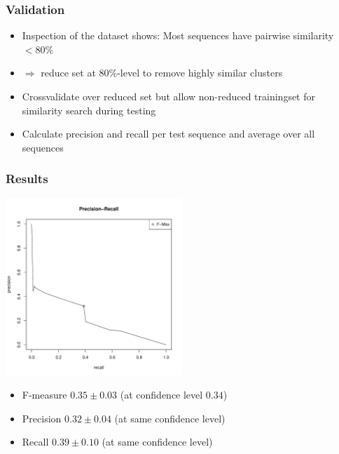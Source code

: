 \documentclass{beamer}
\begin{document}
\begin{frame}
	\frametitle{Validation}
	
	\begin{itemize}
		\item Inspection of the dataset shows: Most sequences have pairwise similarity $< 80\%$
		\item[] $\Rightarrow$ reduce set at $80\%$-level to remove highly similar clusters
		\item Crossvalidate over reduced set but allow non-reduced trainingset for similarity search during testing
		\item Calculate precision and recall per test sequence and average over all sequences
	\end{itemize}
\end{frame}

\begin{frame}
	\frametitle{Results}
	\begin{center}
	\includegraphics[width=0.5\textwidth]{PreRec_3_folds.pdf}
	\end{center}
	\begin{itemize}
		\item F-measure $0.35\pm0.03$ (at confidence level $0.34$)
		\item Precision $0.32\pm0.04$ (at same confidence level)
		\item Recall  $0.39\pm0.10$ (at same confidence level)
	\end{itemize}		
	
\end{frame}
\end{document}

